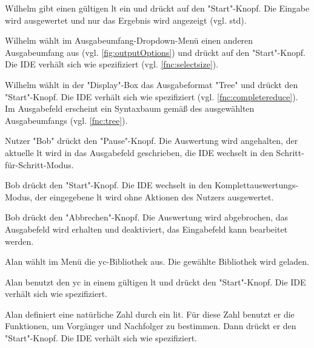 \documentclass[parskip=full,11pt,twoside]{scrartcl}
\begin{document}

{Wilhelm gibt einen gültigen \gls{lt} ein und drückt auf den "Start"-Knopf. }
{Die Eingabe wird ausgewertet und nur das Ergebnis wird angezeigt (vgl. \gls{std}).}

{Wilhelm wählt im Ausgabeumfang-Dropdown-Menü einen anderen Ausgabeumfang aus (vgl. \cref{fig:outputOptions}) und drückt auf den "Start"-Knopf.}
{Die IDE verhält sich wie spezifiziert (vgl. \ref{fnc:selectsize}).}

{Wilhelm wählt in der "Display"-Box das Ausgabeformat "Tree" und drückt den "Start"-Knopf.}
{Die IDE verhält sich wie spezifiziert (vgl. \ref{fnc:completereduce}).
 Im Ausgabefeld erscheint ein Syntaxbaum gemäß des ausgewählten Ausgabeumfangs (vgl. \ref{fnc:tree}).}
 

{Nutzer "Bob" drückt den "Pause"-Knopf.}
{Die Auswertung wird angehalten, der aktuelle \gls{lt} wird in das Ausgabefeld geschrieben, die IDE wechselt in den Schritt-für-Schritt-Modus.}

{Bob drückt den "Start"-Knopf.}
{Die IDE wechselt in den Komplettauswertungs-Modus, der eingegebene \gls{lt} wird ohne Aktionen des Nutzers ausgewertet.}

{Bob drückt den "Abbrechen"-Knopf.}
{Die Auswertung wird abgebrochen, das Ausgabefeld wird erhalten und deaktiviert, das Eingabefeld kann bearbeitet werden.}
 

{Alan wählt im Menü die \gls{yc}-Bibliothek aus.}
{Die gewählte Bibliothek wird geladen.}

{Alan benutzt den \gls{yc} in einem gültigen \gls{lt} und drückt den "Start"-Knopf.}
{Die IDE verhält sich wie spezifiziert.}

{Alan definiert eine natürliche Zahl durch ein \gls{lit}.
 Für diese Zahl benutzt er die Funktionen, um Vorgänger und Nachfolger zu bestimmen.
 Dann drückt er den "Start"-Knopf.}
{Die IDE verhält sich wie spezifiziert.}
\end{document}

